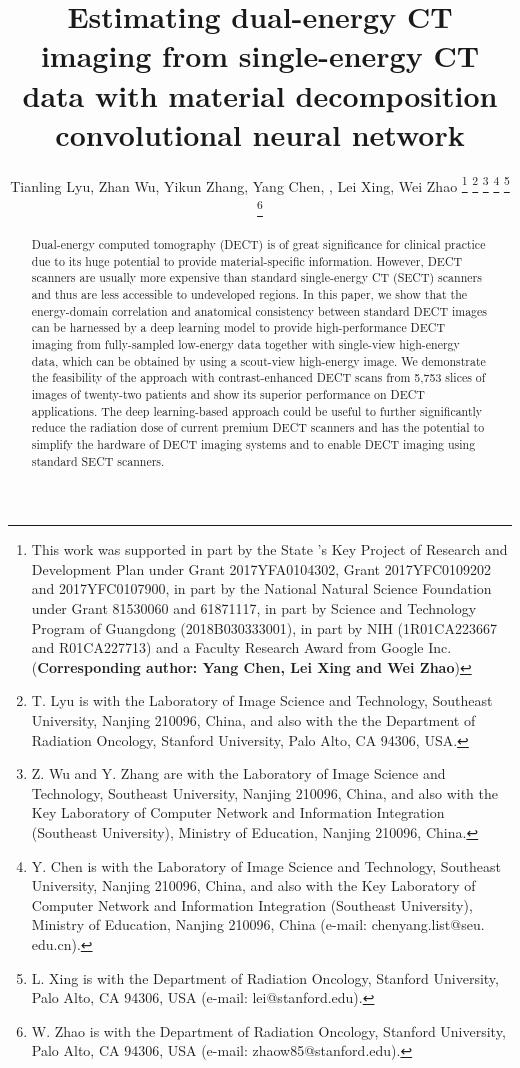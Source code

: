 \documentclass[journal,twoside,web]{ieeecolor}
\begin{document}
\title{Estimating dual-energy CT imaging from single-energy CT data with material decomposition convolutional neural network}
\author{Tianling Lyu, Zhan Wu, Yikun Zhang, Yang Chen, , Lei Xing, Wei Zhao
\thanks{This work was supported in part by the State ’s Key Project of Research and Development Plan under Grant 2017YFA0104302, Grant 2017YFC0109202 and 2017YFC0107900, in part by the National Natural Science Foundation under Grant 81530060 and 61871117, in part by Science and Technology Program of Guangdong (2018B030333001), in part by NIH (1R01CA223667 and R01CA227713) and a Faculty Research Award from Google Inc. (\textbf{Corresponding author: Yang Chen, Lei Xing and Wei Zhao})}
\thanks{T. Lyu is with the Laboratory of Image Science and Technology, Southeast University, Nanjing 210096, China, and also with the the Department of Radiation Oncology, Stanford University, Palo Alto, CA 94306, USA.}
\thanks{Z. Wu and Y. Zhang are with the Laboratory of Image Science and Technology, Southeast University, Nanjing 210096, China, and also with the Key Laboratory of Computer Network and Information Integration (Southeast University), Ministry of Education, Nanjing 210096, China.}
\thanks{Y. Chen is with the Laboratory of Image Science and Technology, Southeast University, Nanjing 210096, China, and also with the Key Laboratory of Computer Network and Information Integration (Southeast University), Ministry of Education, Nanjing 210096, China (e-mail: chenyang.list@seu. edu.cn).}
\thanks{L. Xing is with the Department of Radiation Oncology, Stanford University, Palo Alto, CA 94306, USA (e-mail: lei@stanford.edu).}
\thanks{W. Zhao is with the Department of Radiation Oncology, Stanford University, Palo Alto, CA 94306, USA (e-mail: zhaow85@stanford.edu).}}
\maketitle

\begin{abstract}
    Dual-energy computed tomography (DECT) is of great significance for clinical practice due to its huge potential to provide material-specific information. However, DECT scanners are usually more expensive than standard single-energy CT (SECT) scanners and thus are less accessible to undeveloped regions. In this paper, we show that the energy-domain correlation and anatomical consistency between standard DECT images can be harnessed by a deep learning model to provide high-performance DECT imaging from fully-sampled low-energy data together with single-view high-energy data, which can be obtained by using a scout-view high-energy image. We demonstrate the feasibility of the approach with contrast-enhanced DECT scans from 5,753 slices of images of twenty-two patients and show its superior performance on DECT applications. The deep learning-based approach could be useful to further significantly reduce the radiation dose of current premium DECT scanners and has the potential to simplify the hardware of DECT imaging systems and to enable DECT imaging using standard SECT scanners.
\end{abstract}
\end{document}
